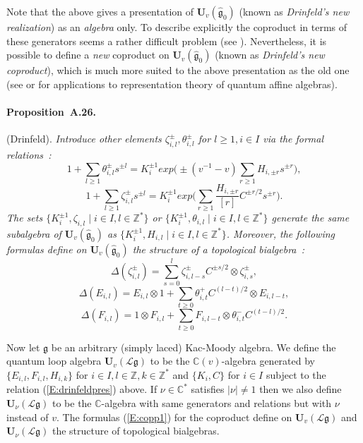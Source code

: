 \documentclass[a4paper,10pt]{amsart}
\def\Z{\mathbb{Z}}
\def\U{\mathbf{U}}
\def\C{\mathbb{C}}
\def\g{\mathfrak{g}}
\numberwithin{equation}{section}
\begin{document}
{\vspace{.15in}

Note that the above gives a presentation of $\U_v(\widehat{\g}_0)$ (known as \textit{Drinfeld's new realization}) as an \textit{algebra} only. To describe explicitly the coproduct in terms of these generators seems a rather difficult problem (see \cite{Hubery3}). Nevertheless, it is possible to define a \textit{new} coproduct on $\U_v(\widehat{\g}_0)$ (known as \textit{Drinfeld's new coproduct}), which is much more suited to the above presentation as the old one (see \cite{CP} or \cite{Hernandez} for applications to representation theory of quantum affine algebras).

\vspace{.1in}

\paragraph{\textbf{Proposition~A.26.}}(Drinfeld).\textit{ Introduce other elements $\zeta_{i,l}^{\pm}, \theta_{i,l}^{\pm}$ for $l \geq 1, i \in I$ via the formal relations~:
$$1+\sum_{l \geq 1} \theta_{i,l}^{\pm}s^{\pm l}= K_i^{\pm 1} exp\bigg(\pm (v^{-1}-v) \sum_{r \geq 1} H_{i,\pm r}s^{\pm r}\bigg),$$
$$1+\sum_{l \geq 1} \zeta_{i,l}^{\pm}s^{\pm l}= K_i^{\pm 1} exp\bigg( \sum_{r \geq 1} \frac{H_{i,\pm r}}{[r]}C^{\pm r/2} s^{\pm r}\bigg).$$
The sets $\{K_i^{\pm 1},\zeta_{i,l}\;|\; i \in I, l \in \Z^*\}$ or $\{K_i^{\pm 1},\theta_{i,l}\;|\; i \in I, l \in \Z^*\}$ generate the same subalgebra of $\U_v(\widehat{\g}_0)$ as $\{K_i^{\pm 1}, H_{i,l}\;|\; i \in I, l \in \Z^*\}$.
Moreover, the following formulas define on $\U_v(\widehat{\g}_0)$ the structure of a topological bialgebra~:
$$\Delta(\zeta_{i,l}^{\pm})=\sum_{s=0}^l \zeta_{i,l-s}^{\pm} C^{\pm s/2}\otimes \zeta_{i,s}^{\pm},$$
\begin{equation}\label{E:copp1}
\Delta(E_{i,l})=E_{i,l} \otimes 1 + \sum_{t \geq 0} \theta^+_{i,t}C^{(l-t)/2}\otimes E_{i,l-t},
\end{equation}
$$\Delta(F_{i,l})= 1 \otimes F_{i,l}  + \sum_{t \geq 0} F_{i,l-t} \otimes \theta^-_{i,t}C^{(t-l)/2}.$$}

\vspace{.15in}

Now let $\g$ be an arbitrary (simply laced) Kac-Moody algebra. We define the quantum loop algebra $\U_v(\mathcal{L}\g)$ to be the $\C(v)$-algebra generated by $\{E_{i,l},F_{i,l}, H_{i,k}\}$ for $ i \in I, l \in \Z, k \in \Z^*$ and $\{K_i, C\}$ for $i \in I$ subject to the relation (\ref{E:drinfeldpres}) above. If $\nu \in \C^*$ satisfies $|\nu| \neq 1$ then we also define $\U_{\nu}(\mathcal{L}\g)$ to be the $\C$-algebra with same generators and relations but with $\nu$ instead of $v$. The formulas (\ref{E:copp1}) for the coproduct define on $\U_v(\mathcal{L}\g)$ and $\U_{\nu}(\mathcal{L}\g)$ the structure of topological bialgebras.

}
\end{document}
